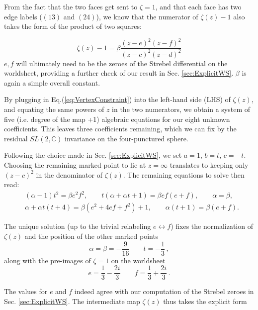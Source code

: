 \documentclass[english]{article}
\renewcommand{\>}{\rangle}
\newcommand{\<}{\langle}
\renewcommand{\(}{\left(}
\renewcommand{\)}{\right)}
\begin{document}
From the fact that the two faces get sent to $\zeta=1$, and that each face has two edge labels ($(13)$ and $(24)$), we know that the numerator of $\zeta(z)-1$ also takes the form of the product of two squares:

\begin{equation}
    \zeta(z)-1 = \beta \frac{(z-e)^2 (z-f)^2}{(z-c)^2(z-d)^2} \label{eq:FaceConstraint}
\end{equation}
$e,f$ will ultimately need to be the zeroes of the Strebel differential on the worldsheet, providing a further check of our result in Sec. \ref{sec:ExplicitWS}. $\beta$ is again a simple overall constant.

By plugging in Eq.(\ref{eq:VertexConstraint}) into the left-hand side (LHS) of $\zeta(z)$, and equating the same powers of $z$ in the two numerators, we obtain a system of five (i.e. degree of the map +1) algebraic equations for our eight unknown coefficients. This leaves three coefficients remaining, which we can fix by the residual $SL(2,\mathbb{C})$ invariance on the four-punctured sphere\cite{zvonkine:hal-00347348}.

Following the choice made in Sec. \ref{sec:ExplicitWS}, we set $a=1$, $b=t$, $c=-t$. Choosing the remaining marked point to lie at $z=\infty$ translates to keeping only $(z-c)^2$ in the denominator of $\zeta(z)$. The remaining equations to solve then read:
\begin{align}
 &(\alpha -1) t^2=\beta  e^2 f^2, \qquad
 t (\alpha +\alpha  t+1)=\beta  e f (e+f), \qquad
 \alpha =\beta ,  \nonumber\\
 &\alpha +\alpha  t (t+4)=\beta  \left(e^2+4 e f+f^2\right)+1,\qquad 
 \alpha  (t+1)=\beta  (e+f).
\end{align}

The unique solution (up to the trivial relabeling $e \leftrightarrow f$) fixes the normalization of $\zeta(z)$ and the position of the other marked points 
\begin{equation}
    \alpha = \beta = -\frac{9}{16} \qquad  t = - \frac{1}{3}\,,
\end{equation} 
along with the pre-images of $\zeta=1$ on the worldsheet
\begin{equation}
    e = \frac{1}{3} -\frac{2i}{3} \qquad f = \frac{1}{3} +\frac{2i}{3} \,.
\end{equation}

The values for $e$ and $f$ indeed agree with our computation of the Strebel zeroes in Sec. \ref{sec:ExplicitWS}. The intermediate map $\zeta(z)$ thus takes the explicit form
\end{document}
